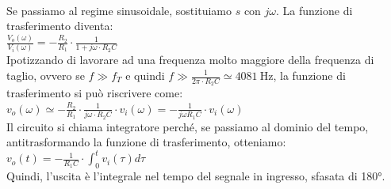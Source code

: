 \documentclass{report}
\begin{document}
\\Se passiamo al regime sinusoidale, sostituiamo $s$ con $j\omega$. La funzione di trasferimento diventa:
\\[2pt]\indent $\displaystyle{\frac{V_o(\omega)}{V_i(\omega)}=-\frac{R_2}{R_1}\cdot\frac{1}{1+j\omega\cdot R_2C}}$
\\[2pt]Ipotizzando di lavorare ad una frequenza molto maggiore della frequenza di taglio, ovvero se $f\gg f_T$ e quindi $\displaystyle{f\gg \frac{1}{2\pi\cdot R_2C}\simeq\SI{4081}{\hertz}}$, la funzione di trasferimento si può riscrivere come:
\\[2pt]\indent$\displaystyle{v_o(\omega)\simeq-\frac{R_2}{R_1}\cdot\frac{1}{j\omega\cdot R_2C}\cdot v_i(\omega)=-\frac{1}{j\omega R_1C}\cdot v_i(\omega)}$
\\[2pt]Il circuito si chiama integratore perché, se passiamo al dominio del tempo, antitrasformando la funzione di trasferimento, otteniamo:
\\[2pt]\indent$\displaystyle{v_o(t)=-\frac{1}{R_1C}\cdot\int_{0}^{t}v_i(\tau)d\tau}$
\\[2pt]Quindi, l'uscita è l'integrale nel tempo del segnale in ingresso, sfasata di 180°.
\end{document}
